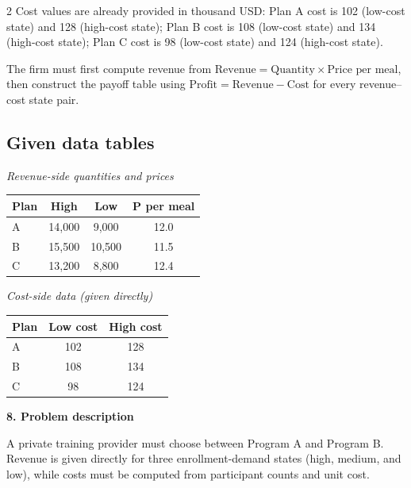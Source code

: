 \documentclass[12pt]{article}
\newcommand{\SubsectionBox}[1]{%
	\noindent\colorbox{gray!30}{%
		\parbox{\linewidth}{\textbf{#1}}%
	}\par\vspace{0.35cm}%
}
\begin{document}
\begin{multicols}{2}
				Cost values are already provided in thousand USD:
				Plan A cost is 102 (low-cost state) and 128 (high-cost state);
				Plan B cost is 108 (low-cost state) and 134 (high-cost state);
				Plan C cost is 98 (low-cost state) and 124 (high-cost state).
				
				The firm must first compute revenue from
				\(\text{Revenue}=\text{Quantity}\times\text{Price per meal}\), then construct the payoff table using
				\(\text{Profit}=\text{Revenue}-\text{Cost}\) for every revenue--cost state pair.
				\subsection*{Given data tables}
				\begin{center}
					\textit{Revenue-side quantities and prices}
					\begin{center}
						\begin{tabular}{l c c c}
							\toprule
							Plan & High & Low & P per meal \\
							\midrule
							A & 14{,}000 & 9{,}000 & 12.0 \\
							B & 15{,}500 & 10{,}500 & 11.5 \\
							C & 13{,}200 & 8{,}800 & 12.4 \\
							\bottomrule
						\end{tabular}
					\end{center}
					
					\vspace{0.5cm}
					
					\textit{Cost-side data (given directly)}
					\begin{center}
						\begin{tabular}{l c c}
							\toprule
							Plan & Low cost & High cost \\
							\midrule
							A & 102 & 128 \\
							B & 108 & 134 \\
							C & 98 & 124 \\
							\bottomrule
						\end{tabular}
					\end{center}
				\end{center}
				
		\vspace{0.25cm}
		\SubsectionBox{8. Problem description}\vspace{-0.25cm}
		A private training provider must choose between Program A and Program B.
				Revenue is given directly for three enrollment-demand states (high, medium, and low), while costs must be computed from participant counts and unit cost.
				

\end{multicols}
\end{document}
